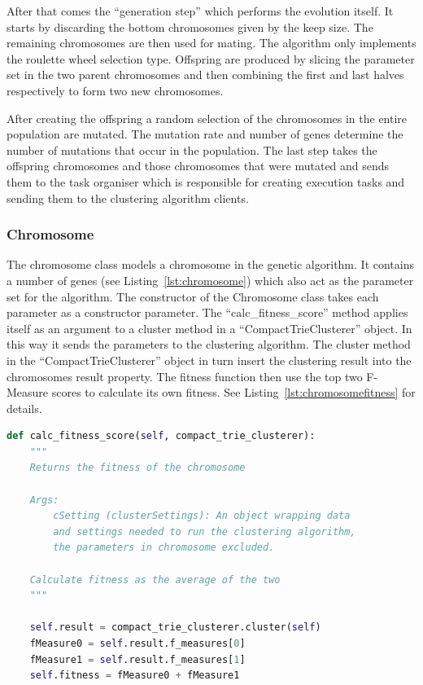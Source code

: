 After that comes the ``generation step'' which performs the evolution itself. It starts by discarding the bottom chromosomes given by the keep size. The remaining chromosomes are then used for mating. The algorithm only implements the roulette wheel selection type. Offspring are produced by slicing the parameter set in the two parent chromosomes and then combining the first and last halves respectively to form two new chromosomes.

After creating the offspring a random selection of the chromosomes in the entire population are mutated. The mutation rate and number of genes determine the number of mutations that occur in the population. The last step takes the offspring chromosomes and those chromosomes that were mutated and sends them to the task organiser which is responsible for creating execution tasks and sending them to the clustering algorithm clients.

\subsubsection{Chromosome}
The chromosome class models a chromosome in the genetic algorithm. It contains a number of genes (see Listing~\ref{lst:chromosome}) which also act as the parameter set for the \CTC algorithm. The constructor of the Chromosome class takes each parameter as a constructor parameter. The ``calc\_fitness\_score'' method applies itself as an argument to a cluster method in a ``CompactTrieClusterer'' object. In this way it sends the \CTC parameters to the clustering algorithm. The cluster method in the ``CompactTrieClusterer'' object in turn insert the clustering result into the chromosomes result property. The fitness function then use the top two F-Measure scores to calculate its own fitness. See Listing~\ref{lst:chromosomefitness} for details.

\begin{lstlisting}[float=ht, language=python, breaklines=true, label=lst:chromosomefitness, caption={Fitness function in the Chromosome class.}]
def calc_fitness_score(self, compact_trie_clusterer):
    """
    Returns the fitness of the chromosome

    Args:
        cSetting (clusterSettings): An object wrapping data
        and settings needed to run the clustering algorithm,
        the parameters in chromosome excluded.

    Calculate fitness as the average of the two
    """

    self.result = compact_trie_clusterer.cluster(self)
    fMeasure0 = self.result.f_measures[0]
    fMeasure1 = self.result.f_measures[1]
    self.fitness = fMeasure0 + fMeasure1
\end{lstlisting}

